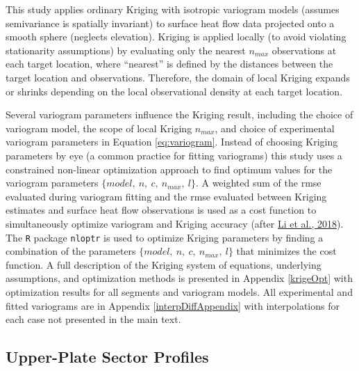 This study applies ordinary Kriging with isotropic variogram models (assumes semivariance is spatially invariant) to surface heat flow data projected onto a smooth sphere (neglects elevation). Kriging is applied locally (to avoid violating stationarity assumptions) by evaluating only the nearest \(n_{max}\) observations at each target location, where ``nearest'' is defined by the distances between the target location and observations. Therefore, the domain of local Kriging expands or shrinks depending on the local observational density at each target location.

Several variogram parameters influence the Kriging result, including the choice of variogram model, the scope of local Kriging \(n_{max}\), and choice of experimental variogram parameters in Equation \eqref{eq:variogram}. Instead of choosing Kriging parameters by eye (a common practice for fitting variograms) this study uses a constrained non-linear optimization approach to find optimum values for the variogram parameters \(\{model,\ n,\ c,\ n_{max},\ l\}\). A weighted sum of the \gls{rmse} evaluated during variogram fitting and the \gls{rmse} evaluated between Kriging estimates and surface heat flow observations is used as a cost function to simultaneously optimize variogram and Kriging accuracy (after \protect\hyperlink{ref-li2018}{Li et al., 2018}). The \texttt{R} package \texttt{nloptr} is used to optimize Kriging parameters by finding a combination of the parameters \(\{model,\ n,\ c,\ n_{max},\ l\}\) that minimizes the cost function. A full description of the Kriging system of equations, underlying assumptions, and optimization methods is presented in Appendix \ref{krigeOpt} with optimization results for all segments and variogram models. All experimental and fitted variograms are in Appendix \ref{interpDiffAppendix} with interpolations for each case not presented in the main text.

\hypertarget{upSectors}{%
\subsection{Upper-Plate Sector Profiles}\label{upSectors}}

